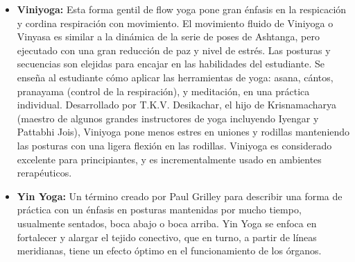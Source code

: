 \begin{itemize}
	\item \textbf{Viniyoga:} Esta forma gentil de flow yoga pone gran \'enfasis en la respicación y cordina respiración con movimiento. El movimiento fluido de Viniyoga o Vinyasa es similar a la dinámica de la serie de poses de Ashtanga, pero ejecutado con una gran reducción de paz y nivel de estr\'es. Las posturas y secuencias son elejidas para encajar en las habilidades del estudiante. Se enseña al estudiante cómo aplicar las herramientas de yoga: asana, cántos, pranayama (control de la respiración), y meditación, en una práctica individual. Desarrollado por T.K.V. Desikachar, el hijo de Krisnamacharya (maestro de algunos grandes instructores de yoga incluyendo Iyengar y Pattabhi Jois), Viniyoga pone menos estres en uniones y rodillas manteniendo las posturas con una ligera flexión en las rodillas. Viniyoga es considerado excelente para principiantes, y es incrementalmente usado en ambientes rerap\'euticos.
	\item \textbf{Yin Yoga:} Un t\'ermino creado por Paul Grilley para describir una forma de práctica con un \'enfasis en posturas mantenidas por mucho tiempo, usualmente sentados, boca abajo o boca arriba. Yin Yoga se enfoca en fortalecer y alargar el tejido conectivo, que en turno, a partir de líneas meridianas, tiene un efecto óptimo en el funcionamiento de los órganos.
\end{itemize}


